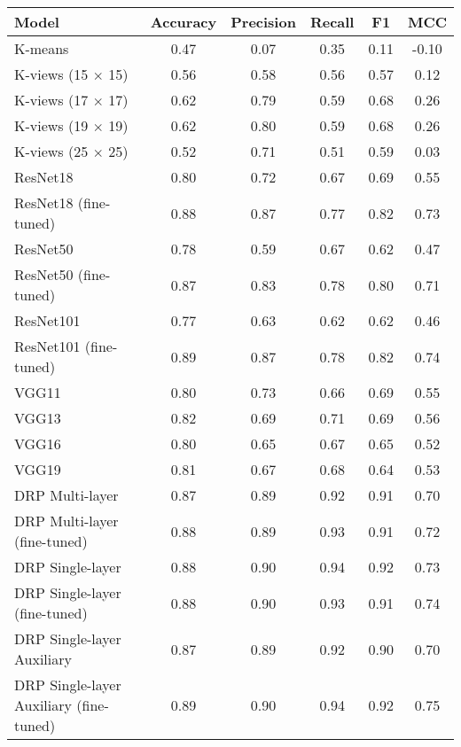 \begin{tabular}{lccccc}
    \toprule
    Model                                   & Accuracy & Precision & Recall & F1   & MCC   \\
    \midrule
    K-means                                 & 0.47     & 0.07      & 0.35   & 0.11 & -0.10 \\
    K-views (15 $\times$ 15)                & 0.56     & 0.58      & 0.56   & 0.57 & 0.12  \\
    K-views (17 $\times$ 17)                & 0.62     & 0.79      & 0.59   & 0.68 & 0.26  \\
    K-views (19 $\times$ 19)                & 0.62     & 0.80      & 0.59   & 0.68 & 0.26  \\
    K-views (25 $\times$ 25)                & 0.52     & 0.71      & 0.51   & 0.59 & 0.03  \\
    \hline
    ResNet18                                & 0.80     & 0.72      & 0.67   & 0.69 & 0.55  \\
    ResNet18 (fine-tuned)                   & 0.88     & 0.87      & 0.77   & 0.82 & 0.73  \\
    ResNet50                                & 0.78     & 0.59      & 0.67   & 0.62 & 0.47  \\
    ResNet50 (fine-tuned)                   & 0.87     & 0.83      & 0.78   & 0.80 & 0.71  \\
    ResNet101                               & 0.77     & 0.63      & 0.62   & 0.62 & 0.46  \\
    ResNet101 (fine-tuned)                  & 0.89     & 0.87      & 0.78   & 0.82 & 0.74  \\
    \hline
    VGG11                                   & 0.80     & 0.73      & 0.66   & 0.69 & 0.55  \\
    VGG13                                   & 0.82     & 0.69      & 0.71   & 0.69 & 0.56  \\
    VGG16                                   & 0.80     & 0.65      & 0.67   & 0.65 & 0.52  \\
    VGG19                                   & 0.81     & 0.67      & 0.68   & 0.64 & 0.53  \\
    \hline
    DRP Multi-layer                         & 0.87     & 0.89      & 0.92   & 0.91 & 0.70  \\
    DRP Multi-layer (fine-tuned)            & 0.88     & 0.89      & 0.93   & 0.91 & 0.72  \\
    DRP Single-layer                        & 0.88     & 0.90      & 0.94   & 0.92 & 0.73  \\
    DRP Single-layer (fine-tuned)           & 0.88     & 0.90      & 0.93   & 0.91 & 0.74  \\
    DRP Single-layer Auxiliary              & 0.87     & 0.89      & 0.92   & 0.90 & 0.70  \\
    DRP Single-layer Auxiliary (fine-tuned) & 0.89     & 0.90      & 0.94   & 0.92 & 0.75  \\
    \bottomrule
\end{tabular}
